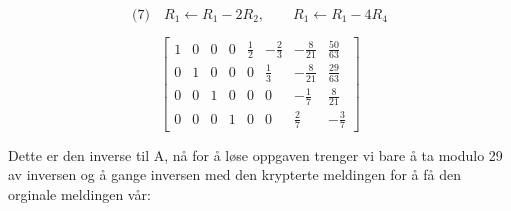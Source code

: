 \documentclass[12pt,a4paper]{article}
\begin{document}
\[ \text{(7)}\quad R_1 \leftarrow R_1 - 2R_2, \qquad R_1 \leftarrow R_1 - 4R_4 \]



\[
\left[
\begin{array}{cccc|cccc}
1 & 0 & 0 & 0 & \tfrac12 & -\tfrac{2}{3} & -\tfrac{8}{21} & \tfrac{50}{63} \\
0 & 1 & 0 & 0 & 0 & \tfrac13 & -\tfrac{8}{21} & \tfrac{29}{63} \\
0 & 0 & 1 & 0 & 0 & 0 & -\tfrac{1}{7} & \tfrac{8}{21} \\
0 & 0 & 0 & 1 & 0 & 0 & \tfrac{2}{7} & -\tfrac{3}{7}
\end{array}
\right]
\]

\vspace{1.5cm}

Dette er den inverse til A, nå for å løse oppgaven trenger vi bare å ta modulo 29 av inversen og å gange inversen med den krypterte meldingen for å få den orginale meldingen vår:

\vspace{1cm}
\end{document}
